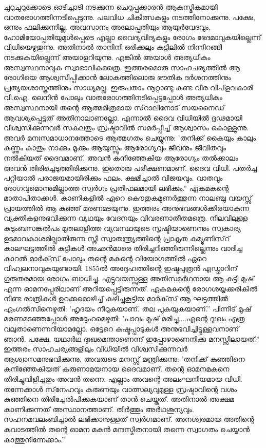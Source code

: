 ചുറുചുറുക്കോടെ ഓടിച്ചാടി നടക്കുന്ന ചെറുപ്പക്കാരന്‍ ആകസ്മികമായി വാതരോഗത്തിന്നടിപ്പെടുന്നു. പലവിധ ചികിത്സകളും നടത്തിനോക്കുന്നു. പക്ഷേ, ഒന്നും ഫലിക്കുന്നില്ല. അവസാനം അലോപ്പതിയും ആയുര്‍വേദവും, ഹോമിയോപ്പതിയുമുള്‍പ്പെടെ എല്ലാ വൈദ്യവിദ്യകളും രോഗം ഭേദമാവുകയില്ലെന്ന് വിധിയെഴുതുന്നു. അതിനാല്‍ താനിനി ഒരിക്കലും കട്ടിലില്‍ നിന്നിറങ്ങി നടക്കുകയില്ലെന്ന് അയാളറിയുന്നു. എങ്കില്‍ അയാള്‍ അത്യധികം അസ്വസ്ഥനാവുക സ്വാഭാവികമത്രെ. ഇത്തരമൊരു സാഹചര്യത്തില്‍ ആ രോഗിയെ ആശ്വസിപ്പിക്കാന്‍ ലോകത്തിലൊരു ഭൗതിക ദര്‍ശനത്തിനും പ്രത്യയശാസ്ത്രത്തിനും സാധ്യമല്ല. ഇരുപതാം നൂറ്റാണ്ടു കണ്ട വീര വിപ്‌ളവകാരി വി.ഐ. ലെനിന്‍ പോലും വാതരോഗത്തിനടിപ്പെട്ടപ്പോള്‍ അത്യധികം അസ്വസ്ഥനായി തന്റെ ആത്മമിത്രമായ സ്‌റാലിനോട് സയനൈഡ് ആവശ്യപ്പെട്ടത് അതിനാലാണല്ലോ. എന്നാല്‍ ദൈവ വിധിയില്‍ ദൃഢമായി വിശ്വസിക്കുന്നവര്‍ സകലതും സ്രഷ്ടാവില്‍ സമര്‍പ്പിച്ച് ആശ്വാസം കൊള്ളുന്നു. അവര്‍ മനഃസമാധാനത്തോടെ ആത്മഗതം ചെയ്യുന്നു: 'തനിക്ക് കൈയും കാലും കണ്ണും കാതും നാക്കും മൂക്കും ആയുസ്സും ആരോഗ്യവും ജീവനും ജീവിതവും നല്‍കിയത് ദൈവമാണ്. അവന്‍ കനിഞ്ഞേകിയ ആരോഗ്യം തല്‍ക്കാലം അവന്‍ തിരിച്ചെടുത്തിരിക്കുന്നു. ഇതൊരു പരീക്ഷണമാണ്. ദൈവ വിധി. പതര്‍ച്ച പറ്റിയാല്‍ പരാജയമായിരിക്കും ഫലം. ക്ഷമിച്ചാല്‍ വിജയവും. വാതവും രോഗവുമൊന്നുമില്ലാത്ത സ്വര്‍ഗം പ്രതിഫലമായി ലഭിക്കും.''
ഏകമകന്റെ മാതാപിതാക്കള്‍. കാണികളില്‍ ഏറെ കൌതുകമുണര്‍ത്തുന്ന നാലഞ്ചു വയസ്സ് പ്രായത്തില്‍ ആ കുഞ്ഞ് മരണമടയുന്നു. ഇത്തരം അനുഭവങ്ങള്‍ക്കിരയാകുന്ന വ്യക്തികളനുഭവിക്കുന്ന വ്യഥയും വേദനയും വിവരണാതീതമത്രെ. നിലവിലുള്ള കുടുംബസങ്കല്‍പം മുതലാളിത്ത വ്യവസ്ഥയുടെ സൃഷ്ടിയാണെന്നും സ്വകാര്യ ഉടമാവകാശമില്ലാതിരുന്ന സ്ത്രീ സ്വാതന്ത്യ്രത്തിന്റെ പ്രാകൃത കമ്യൂണിസ്‌റ് കാലഘട്ടത്തില്‍ കുട്ടികള്‍ അഛന്‍മാരെ തിരിച്ചറിഞ്ഞിരുന്നില്ലെന്നും വാദിച്ച കാറല്‍ മാര്‍ക്‌സ് പോലും തന്റെ മകന്റെ വിയോഗത്തില്‍ ഏറെ വിഹ്വലനാവുകയുണ്ടായി. 1855ല്‍ അദ്ദേഹത്തിന്റെ ഇഷ്ടപുത്രന്‍ എഡ്ഗാറിന് ഗുരുതരമായ രോഗം ബാധിച്ചു. എട്ടുവയസ്സുള്ള അതിസമര്‍ഥനായ ആ കുട്ടി മുഷ് എന്ന ഓമനപ്പേരിലാണ് അറിയപ്പെട്ടിരുന്നത്. ഏകമകന്റെ രോഗശയ്യക്കരികില്‍ നീണ്ട രാത്രികള്‍ ഉറക്കമൊഴിച്ച് കഴിച്ചുകൂട്ടിയ മാര്‍ക്‌സ് ആ ഘട്ടത്തില്‍ ഏംഗല്‍സിനെഴുതി: 'ഹൃദയം നീറുകയാണ്. തല പുകയുകയാണ്.'' പിന്നീട് മുഷ് മരണമടഞ്ഞപ്പോള്‍ അദ്ദേഹമെഴുതി: 'പാവം മുഷ് മരിച്ചു....എന്റെ ദുഃഖം എത്ര വലുതാണെന്നറിയാമല്ലോ. ഒട്ടേറെ കഷ്ടപ്പാടുകള്‍ അനുഭവിച്ചിട്ടുള്ളവനാണ് ഞാന്‍. പക്ഷേ, യഥാര്‍ഥ ദുഃഖമെന്താണെന്ന് ഇപ്പോഴാണെനിക്കു മനസ്സിലായത്.''
ഇത്തരം സാഹചര്യങ്ങളിലും വിധിയില്‍ വിശ്വസിക്കുന്നവര്‍ ആശ്വാസമനുഭവിക്കുന്നു. അവരുടെ മനസ്സ് മന്ത്രിക്കുന്നു: 'തനിക്ക് കുഞ്ഞിനെ കനിഞ്ഞേകിയത് കരുണാമയനായ ദൈവമാണ്. തന്റെ ഓമനമകനെ തിരിച്ചുവിളിച്ചതും അവന്‍ തന്നെ. എല്ലാം അവന്റെ അലംഘനീയമായ വിധി. തന്നേക്കാള്‍ സ്‌നേഹവും കരുണയും വാത്സല്യവുമുള്ള സ്രഷ്ടാവിന്റെ വശം കുഞ്ഞിനെ തിരിച്ചേല്‍പിക്കുകയാണ് താന്‍ ചെയ്തത്. അതിനാല്‍ അക്ഷമ കാണിക്കുന്നത് അസ്ഥാനത്താണ്. തീര്‍ത്തും അര്‍ഥശൂന്യവും. സഹനമവലംബിച്ചാല്‍ ലഭിക്കാനുള്ളത് സ്വര്‍ഗമാണ്. അനശ്വരമായ അതിന്റെ കവാടത്തില്‍ തന്റെ ഓമന മകന്‍ മന്ദസ്മിതനായി തന്നെ സ്വാഗതം ചെയ്യാന്‍ കാത്തുനിന്നേക്കാം.''
